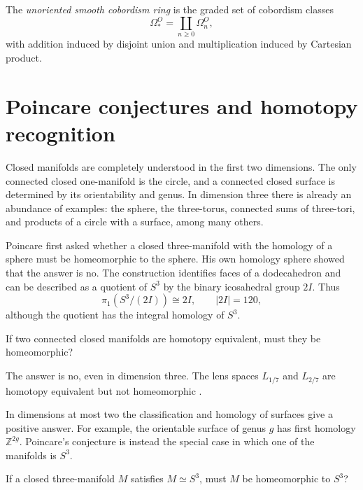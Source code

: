 \begin{definition}
\label{at-definition-cobordism-ring}
The \emph{unoriented smooth cobordism ring}
is the graded set of cobordism classes
$$
\Omega_*^O
=\coprod_{n\geq0}\Omega_n^O,
$$
with addition induced by disjoint union and
multiplication induced by Cartesian product.
\end{definition}


\section{Poincare conjectures and
homotopy recognition}
\label{section-poincare-recognition}

Closed manifolds are completely understood
in the first two dimensions.  The only
connected closed one-manifold is the circle,
and a connected closed surface is determined
by its orientability and genus.  In dimension
three there is already an abundance of
examples: the sphere, the three-torus,
connected sums of three-tori, and products of
a circle with a surface, among many others.

Poincare first asked whether a closed
three-manifold with the homology of a sphere
must be homeomorphic to the sphere.  His own
homology sphere showed that the answer is no.
The construction identifies faces of a
dodecahedron and can be described as a
quotient of $S^3$ by the binary icosahedral
group $2I$.  Thus
$$
\pi _1(S^3/(2I))\cong 2I,
\qquad |2I|=120,
$$
although the quotient has the integral
homology of $S^3$.

\begin{remark}[Question]
\label{at-question-manifold-homotopy-type}
If two connected closed manifolds are
homotopy equivalent, must they be
homeomorphic?
\end{remark}

The answer is no, even in dimension three.
The lens spaces $L_{1/7}$ and $L_{2/7}$ are
homotopy equivalent but not homeomorphic
\cite[Example 2.43]{hat}.

In dimensions at most two the classification
and homology of surfaces give a positive
answer.  For example, the orientable surface
of genus $g$ has first homology
$\mathbb{Z}^{2g}$.  Poincare's conjecture is
instead the special case in which one of the
manifolds is $S^3$.

\begin{remark}
\label{at-question-poincare-homotopy}
If a closed three-manifold $M$ satisfies
$M\simeq S^3$, must $M$ be homeomorphic to
$S^3$?
\end{remark}

